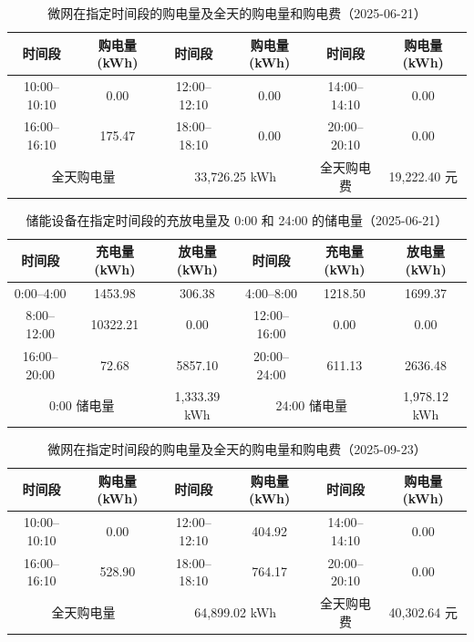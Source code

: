 \documentclass{cumcmthesis}
\begin{document}
\begin{table}[htbp]
\centering
\caption{微网在指定时间段的购电量及全天的购电量和购电费（2025-06-21）}
\label{tab:grid_20250621}
\begin{tabular}{|c|c|c|c|c|c|}
\hline
时间段 & 购电量 (kWh) & 时间段 & 购电量 (kWh) & 时间段 & 购电量 (kWh) \\ \hline
10:00--10:10 & 0.00   & 12:00--12:10 & 0.00 & 14:00--14:10 & 0.00 \\ \hline
16:00--16:10 & 175.47 & 18:00--18:10 & 0.00 & 20:00--20:10 & 0.00 \\ \hline
\multicolumn{2}{|c|}{全天购电量} & \multicolumn{2}{c|}{33,726.25 kWh} & \multicolumn{1}{c|}{全天购电费} & 19,222.40 元 \\ \hline
\end{tabular}
\end{table}

\begin{table}[htbp]
\centering
\caption{储能设备在指定时间段的充放电量及 0:00 和 24:00 的储电量（2025-06-21）}
\label{tab:ess_20250621}
\begin{tabular}{|c|c|c|c|c|c|}
\hline
时间段 & 充电量 (kWh) & 放电量 (kWh) & 时间段 & 充电量 (kWh) & 放电量 (kWh) \\ \hline
0:00--4:00   & 1453.98  & 306.38  & 4:00--8:00   & 1218.50 & 1699.37 \\ \hline
8:00--12:00  & 10322.21 & 0.00    & 12:00--16:00 & 0.00    & 0.00    \\ \hline
16:00--20:00 & 72.68    & 5857.10 & 20:00--24:00 & 611.13  & 2636.48 \\ \hline
\multicolumn{2}{|c|}{0:00 储电量} & 1,333.39 kWh & \multicolumn{2}{c|}{24:00 储电量} & 1,978.12 kWh \\ \hline
\end{tabular}
\end{table}
\begin{table}[htbp]
\centering
\caption{微网在指定时间段的购电量及全天的购电量和购电费（2025-09-23）}
\label{tab:grid_20250923}
\begin{tabular}{|c|c|c|c|c|c|}
\hline
时间段 & 购电量 (kWh) & 时间段 & 购电量 (kWh) & 时间段 & 购电量 (kWh) \\ \hline
10:00--10:10 & 0.00   & 12:00--12:10 & 404.92 & 14:00--14:10 & 0.00 \\ \hline
16:00--16:10 & 528.90 & 18:00--18:10 & 764.17 & 20:00--20:10 & 0.00 \\ \hline
\multicolumn{2}{|c|}{全天购电量} & \multicolumn{2}{c|}{64,899.02 kWh} & \multicolumn{1}{c|}{全天购电费} & 40,302.64 元 \\ \hline
\end{tabular}
\end{table}
\end{document}
